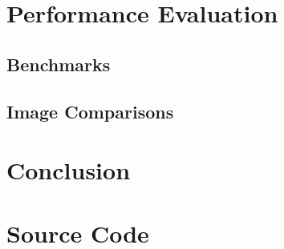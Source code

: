 \documentclass[acmtog, nonacm]{acmart}
\begin{document}
\section{Performance Evaluation}
\subsection{Benchmarks}
\subsection{Image Comparisons}

\section{Conclusion}

\section{Source Code}
\label{sec:sourcecode}





\end{document}
